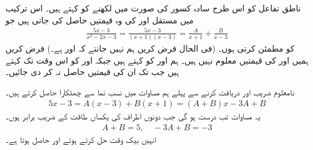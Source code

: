 ناطق تفاعل کو اس طرح سادہ کسور  کی صورت میں لکھنے کو  کہتے ہیں۔ اس ترکیب میں مستقل  اور  کی وہ قیمتیں حاصل کی جاتی ہیں جو
\begin{align}\label{مساوات_طریقہ_جزوی_کسر_ب}
\frac{5x-3}{x^2-2x-3}=\frac{5x-3}{(x+1)(x-3)}=\frac{A}{x+1}+\frac{B}{x-3}
\end{align}
کو مطمئن کرتی  ہوں۔ (فی الحال فرض کریں ہم نہیں جانتے کہ  اور  ہے۔) فرض کریں ہمیں  اور  کی قیمتیں معلوم نہیں ہیں۔ ہم  اور  کو  کہتے ہیں جبکہ   اور    کو اس وقت تک  کہتے ہیں جب تک ان  کی قیمتیں حاصل نہ کر دی جائیں۔

نامعلوم  ضریب   اور  دریافت کرنے سے پہلے ہم مساوات  میں نسب نما سے چھٹکارا حاصل کرتے ہیں۔
\begin{align*}
5x-3=A(x-3)+B(x+1)=(A+B)x-3A+B
\end{align*}
یہ مساوات تب درست ہو گی جب دونوں اطراف  کی  یکساں طاقت کے  ضریب  برابر ہوں۔
\begin{align*}
A+B=5,\quad -3A+B=-3
\end{align*}
انہیں بیک وقت حل کرتے ہوئے  اور  حاصل ہوتا ہے۔

